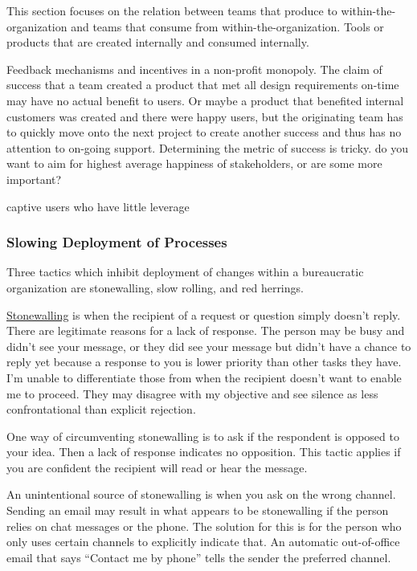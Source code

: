 This section focuses on the relation between teams that produce to within-the-organization and teams that consume from within-the-organization. Tools or products that are created internally and consumed internally.

Feedback mechanisms and incentives in a non-profit monopoly. The claim of success that a team created a product that met all design requirements on-time may have no actual benefit to users. Or maybe a product that benefited internal customers was created and there were happy users, but the originating team has to quickly move onto the next project to create another success and thus has no attention to on-going support. Determining the metric of success is tricky. do you want to aim for highest average happiness of stakeholders, or are some more important?

captive users who have little leverage 


\subsubsection{Slowing Deployment of Processes}

Three tactics which inhibit deployment of changes within a bureaucratic organization are stonewalling, slow rolling, and red herrings. 

\underline{Stonewalling} is when the recipient of a request or question simply doesn't reply. There are legitimate reasons for a lack of response. The person may be busy and didn't see your message, or they did see your message but didn't have a chance to reply yet because a response to you is lower priority than other tasks they have. I'm unable to differentiate those from when the recipient doesn't want to enable me to proceed. They may disagree with my objective and see silence as less confrontational than explicit rejection. 

One way of circumventing stonewalling is to ask if the respondent is opposed to your idea. Then a lack of response indicates no opposition. This tactic applies if you are confident the recipient will read or hear the message.

An unintentional source of stonewalling is when you ask on the wrong channel. Sending an email may result in what appears to be stonewalling if the person relies on chat messages or the phone. The solution for this  is for the person who only uses certain channels to explicitly indicate that. An automatic out-of-office email that says ``Contact me by phone'' tells the sender the preferred channel.

